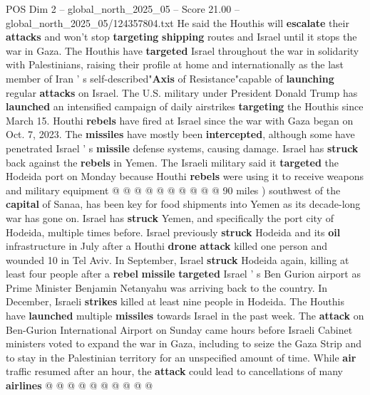 \begin{textsample}{POS Dim 2 – global\_north\_2025\_05 – Score 21.00 – global\_north\_2025\_05/124357804.txt}
He said the Houthis will \textbf{escalate} their \textbf{attacks} and won't stop \textbf{targeting} \textbf{shipping} routes and Israel until it stops the war in Gaza.
The Houthis have \textbf{targeted} Israel throughout the war in solidarity with Palestinians, raising their profile at home and internationally as the last member of Iran ' s self-described"\textbf{Axis} of Resistance"capable of \textbf{launching} regular \textbf{attacks} on Israel.
The U.S. military under President Donald Trump has \textbf{launched} an intensified campaign of daily airstrikes \textbf{targeting} the Houthis since March 15.
Houthi \textbf{rebels} have fired at Israel since the war with Gaza began on Oct. 7, 2023.
The \textbf{missiles} have mostly been \textbf{intercepted}, although some have penetrated Israel ' s \textbf{missile} defense systems, causing damage.
Israel has \textbf{struck} back against the \textbf{rebels} in Yemen.
The Israeli military said it \textbf{targeted} the Hodeida port on Monday because Houthi \textbf{rebels} were using it to receive weapons and military equipment @ @ @ @ @ @ @ @ @ @ 90 miles ) southwest of the \textbf{capital} of Sanaa, has been key for food shipments into Yemen as its decade-long war has gone on.
Israel has \textbf{struck} Yemen, and specifically the port city of Hodeida, multiple times before.
Israel previously \textbf{struck} Hodeida and its \textbf{oil} infrastructure in July after a Houthi \textbf{drone} \textbf{attack} killed one person and wounded 10 in Tel Aviv.
In September, Israel \textbf{struck} Hodeida again, killing at least four people after a \textbf{rebel} \textbf{missile} \textbf{targeted} Israel ' s Ben Gurion airport as Prime Minister Benjamin Netanyahu was arriving back to the country.
In December, Israeli \textbf{strikes} killed at least nine people in Hodeida.
The Houthis have \textbf{launched} multiple \textbf{missiles} towards Israel in the past week.
The \textbf{attack} on Ben-Gurion International Airport on Sunday came hours before Israeli Cabinet ministers voted to expand the war in Gaza, including to seize the Gaza Strip and to stay in the Palestinian territory for an unspecified amount of time.
While \textbf{air} traffic resumed after an hour, the \textbf{attack} could lead to cancellations of many \textbf{airlines} @ @ @ @ @ @ @ @ @ @

\end{textsample}
